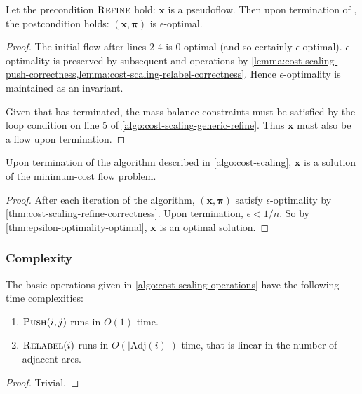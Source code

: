 \begin{thm} \label{thm:cost-scaling-refine-correctness}
Let the precondition $\textproc{Refine}$ hold: $\mathbf{x}$ is a pseudoflow. Then upon termination of , the postcondition holds: $\left(\mathbf{x},\boldsymbol{\pi}\right)$ is $\epsilon$-optimal.
\end{thm}
\begin{proof}
The initial flow after lines 2-4 is $0$-optimal (and so certainly $\epsilon$-optimal). $\epsilon$-optimality is preserved by subsequent  and  operations by \cref{lemma:cost-scaling-push-correctness,lemma:cost-scaling-relabel-correctness}. Hence $\epsilon$-optimality is maintained as an invariant.
 
Given that  has terminated, the mass balance constraints must be satisfied by the loop condition on line 5 of \cref{algo:cost-scaling-generic-refine}. Thus $\mathbf{x}$ must also be a flow upon termination.
\end{proof}

\begin{cor}
Upon termination of the algorithm described in \cref{algo:cost-scaling}, $\mathbf{x}$ is a solution of the minimum-cost flow problem.  
\end{cor}
\begin{proof}
After each iteration of the algorithm, $\left(\mathbf{x},\boldsymbol{\pi}\right)$ satisfy $\epsilon$-optimality by \cref{thm:cost-scaling-refine-correctness}. Upon termination, $\epsilon < 1/n$. So by \cref{thm:epsilon-optimality-optimal}, $\mathbf{x}$ is an optimal solution.
\end{proof}

\subsubsection{Complexity}

\begin{lemma} \label{lemma:cost-scaling-operations-complexity}
The basic operations given in \cref{algo:cost-scaling-operations} have the following time complexities:
\begin{enumerate}[label=(\alph*)]
    \item $\textproc{Push}(i,j)$ runs in $O(1)$ time.
    \item $\textproc{Relabel}(i)$ runs in $O\left(\left|\mathrm{Adj}(i)\right|\right)$ time, that is linear in the number of adjacent arcs.
\end{enumerate}
\end{lemma}
\begin{proof}
Trivial.
\end{proof}

